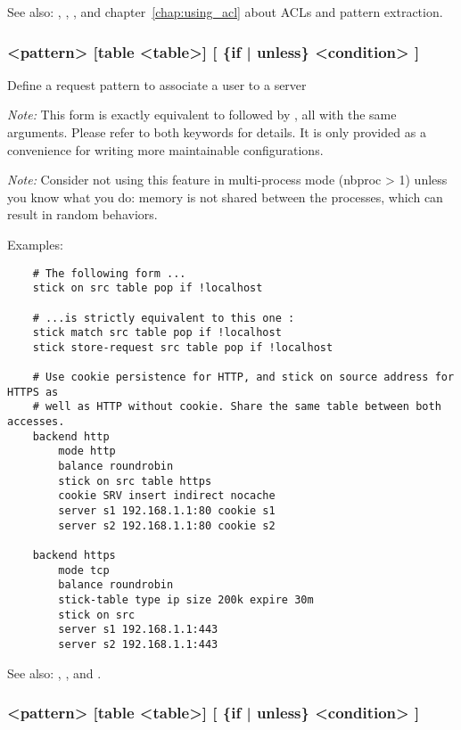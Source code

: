 See also: , , ,  and chapter~\ref{chap:using_acl}
             about ACLs and pattern extraction.


\subsubsection[stick on]{ <pattern> [table <table>] [ \{if | unless\} <condition> ]}

  Define a request pattern to associate a user to a server


  \emph{Note:} This form is exactly equivalent to  followed by
         , all with the same arguments. Please refer
         to both keywords for details. It is only provided as a convenience
         for writing more maintainable configurations.

  \emph{Note:} Consider not using this feature in multi-process mode (nbproc > 1)
         unless you know what you do: memory is not shared between the
         processes, which can result in random behaviors.

  Examples:
  \begin{verbatim}
    # The following form ...
    stick on src table pop if !localhost

    # ...is strictly equivalent to this one :
    stick match src table pop if !localhost
    stick store-request src table pop if !localhost

    # Use cookie persistence for HTTP, and stick on source address for HTTPS as
    # well as HTTP without cookie. Share the same table between both accesses.
    backend http
        mode http
        balance roundrobin
        stick on src table https
        cookie SRV insert indirect nocache
        server s1 192.168.1.1:80 cookie s1
        server s2 192.168.1.1:80 cookie s2

    backend https
        mode tcp
        balance roundrobin
        stick-table type ip size 200k expire 30m
        stick on src
        server s1 192.168.1.1:443
        server s2 192.168.1.1:443
   \end{verbatim}


See also: , ,  and .


\subsubsection[stick store-request]{ <pattern> [table <table>] [ \{if | unless\} <condition> ]}

